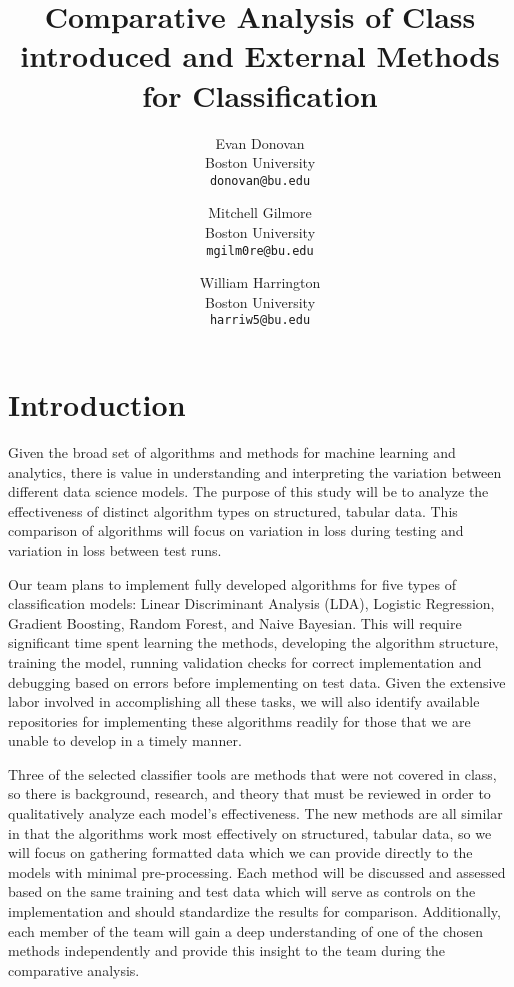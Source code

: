 \documentclass[10pt,twocolumn,letterpaper]{article}
\begin{document}
\title{Comparative Analysis of Class introduced and External Methods for Classification}

\author{Evan Donovan\\
  Boston University\\
  {\tt\small donovan@bu.edu}
  \and
  Mitchell Gilmore\\
  Boston University\\
  {\tt\small mgilm0re@bu.edu}
  \and
  William Harrington\\
  Boston University\\
  {\tt\small harriw5@bu.edu}
}
\maketitle

\section{Introduction}
\label{sec:intro}

Given the broad set of algorithms and methods for machine learning and analytics, there is value in understanding and interpreting the variation between different data science models.
The purpose of this study will be to analyze the effectiveness of distinct algorithm types on structured, tabular data.
This comparison of algorithms will focus on variation in loss during testing and variation in loss between test runs.

Our team plans to implement fully developed algorithms for five types of classification models: Linear Discriminant Analysis (LDA), Logistic Regression, Gradient Boosting, Random Forest, and Naive Bayesian.
This will require significant time spent learning the methods, developing the algorithm structure, training the model, running validation checks for correct implementation and debugging based on errors before implementing on test data.
Given the extensive labor involved in accomplishing all these tasks, we will also identify available repositories for implementing these algorithms readily for those that we are unable to develop in a timely manner.

Three of the selected classifier tools are methods that were not covered in class, so there is background, research, and theory that must be reviewed in order to qualitatively analyze each model’s effectiveness.
The new methods are all similar in that the algorithms work most effectively on structured, tabular data, so we will focus on gathering formatted data which we can provide directly to the models with minimal pre-processing.
Each method will be discussed and assessed based on the same training and test data which will serve as controls on the implementation and should standardize the results for comparison.
Additionally, each member of the team will gain a deep understanding of one of the chosen methods independently and provide this insight to the team during the comparative analysis.
\end{document}
